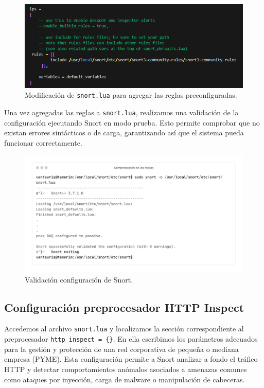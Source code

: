 \documentclass[12pt,a4paper]{report}
\begin{document}
\begin{figure}[H]
	\centering
	\includegraphics[scale=0.8]{instalacion_reglas_snort/2.png}
	\caption{Modificación de \texttt{snort.lua} para agregar las reglas preconfiguradas.}
\end{figure}

Una vez agregadas las reglas a \texttt{snort.lua}, realizamos una validación de la configuración ejecutando Snort en modo prueba. Esto permite comprobar que no existan errores sintácticos o de carga, garantizando así que el sistema pueda funcionar correctamente.

\begin{figure}[H]
	\centering
	\includegraphics[scale=0.12]{instalacion_reglas_snort/3-3.png}
	\caption{Validación configuración de Snort.}
\end{figure}

\newpage

\subsection{Configuración preprocesador HTTP Inspect}

Accedemos al archivo \texttt{snort.lua} y localizamos la sección correspondiente al preprocesador \texttt{http\_inspect = \{\}}. En ella escribimos los parámetros adecuados para la gestión y protección de una red corporativa de pequeña o mediana empresa (PYME). Esta configuración permite a Snort analizar a fondo el tráfico HTTP y detectar comportamientos anómalos asociados a amenazas comunes como ataques por inyección, carga de malware o manipulación de cabeceras.
\end{document}
